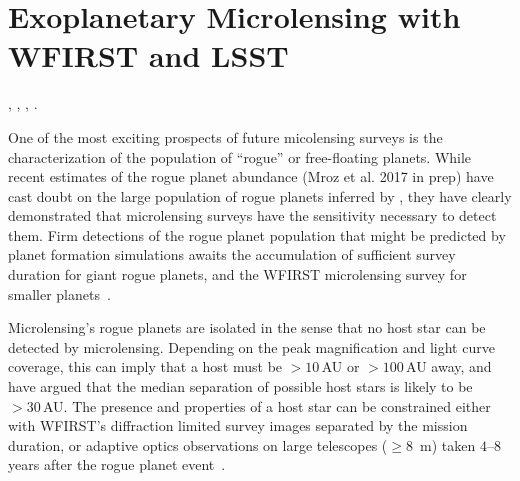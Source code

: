 %
%
%
%

\section{Exoplanetary Microlensing with WFIRST and LSST}
\def\secname{\chpname:microlensing}\label{sec:\secname}

,
,
,
.

One of the most exciting prospects of future micolensing surveys is the 
characterization of the population of ``rogue'' or free-floating planets. 
While recent estimates of the rogue planet abundance (Mroz et al. 2017 in prep)
 have cast doubt on the large population of rogue planets inferred by 
\citet{2011Natur.473..349S}, they have clearly demonstrated that microlensing surveys 
have the sensitivity necessary to detect them. Firm detections of the rogue
planet population that might be predicted by planet formation simulations 
awaits the accumulation of sufficient survey duration for giant rogue planets, 
and the WFIRST microlensing survey for smaller planets~\citep{2015arXiv150303757S,2017arXiv170408749B}.

Microlensing's rogue planets
are isolated in the sense that no host star can be detected
by microlensing. Depending on the peak magnification and light curve
coverage, this can imply that a host must be $> 10\,$AU or $> 100\,$AU away,
and \citet{2012ApJ...757..119B} have argued that the median separation
of possible host stars is likely to be $> 30\,$AU. The presence and properties 
of a host star can be constrained either with WFIRST's diffraction limited survey images separated by the mission duration, or adaptive optics observations on large telescopes ($\ge 8$~m) taken $4$--$8$ years after the rogue planet event~\citep{2016JKAS...49..123G,2016AJ....152...96H}.

